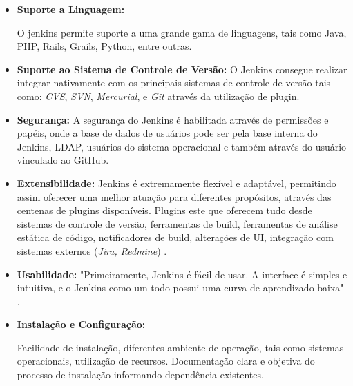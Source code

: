 \begin{itemize}
\item {\textbf{Suporte a Linguagem:}}

O jenkins permite suporte a uma grande gama de linguagens, tais como Java, PHP, Rails, Grails, Python, entre outras.

\item {\textbf{Suporte ao Sistema de Controle de Versão:}}
O Jenkins consegue realizar integrar nativamente com os principais sistemas de controle de versão tais como: \textit{CVS}, \textit{SVN},  \textit{Mercurial}, e \textit{Git} através da utilização de plugin.


\item {\textbf{Segurança:}}
A segurança do Jenkins é habilitada através de permissões e papéis, onde a base de dados de usuários pode ser pela base interna do Jenkins, LDAP, usuários do sistema operacional e também através do usuário vinculado ao GitHub.

\item {\textbf{Extensibilidade:}}
Jenkins é extremamente flexível e adaptável, permitindo assim oferecer uma melhor atuação para diferentes propósitos, através das centenas de plugins disponíveis. Plugins este que oferecem tudo desde sistemas de controle de versão, ferramentas de build, ferramentas de análise estática de código, notificadores de build, alterações de UI, integração com sistemas externos (\textit{Jira, Redmine}) \cite{smart2011}.


\item {\textbf{Usabilidade:}}
"Primeiramente, Jenkins é fácil de usar. A interface é simples e intuitiva, e o Jenkins como um todo possui uma curva de aprendizado baixa" .

\item {\textbf{Instalação e Configuração:}}

Facilidade de instalação, diferentes ambiente de operação, tais como sistemas operacionais, utilização de recursos. Documentação clara e objetiva do processo de instalação informando dependência existentes.


\end{itemize}

